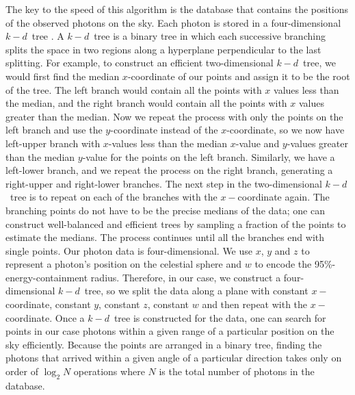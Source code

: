 \documentclass[useAMS,usenatbib]{mn2e}
\begin{document}
The key to the speed of this algorithm is the database that contains
the positions of the observed photons on the sky.  Each photon is
stored in a four-dimensional $k-d$~tree
\citep{Bentley:1975:MBS:361002.361007}.  A $k-d$~tree is a binary tree
in which each successive branching splits the space in two regions
along a hyperplane perpendicular to the last splitting.  For example,
to construct an efficient two-dimensional $k-d$~tree, we would first
find the median $x$-coordinate of our points and assign it to be the
root of the tree.  The left branch would contain all the points with
$x$ values less than the median, and the right branch would contain
all the points with $x$ values greater than the median.  Now we repeat
the process with only the points on the left branch and use the
$y$-coordinate instead of the $x$-coordinate, so we now have
left-upper branch with $x$-values less than the median $x$-value and
$y$-values greater than the median $y$-value for the points on the
left branch.  Similarly, we have a left-lower branch, and we repeat
the process on the right branch, generating a right-upper and
right-lower branches.  The next step in the two-dimensional $k-d$~tree
is to repeat on each of the branches with the $x-$coordinate again.
The branching points do not have to be the precise medians of the
data; one can construct well-balanced and efficient trees by sampling
a fraction of the points to estimate the medians.  The process
continues until all the branches end with single points.  Our photon
data is four-dimensional.  We use $x$, $y$ and $z$ to represent a
photon's position on the celestial sphere and $w$ to encode the
95\%-energy-containment radius. Therefore, in our case, we construct a
four-dimensional $k-d$~tree, so we split the data along a plane with
constant $x-$coordinate, constant $y$, constant $z$, constant $w$ and
then repeat with the $x-$coordinate.  Once a $k-d$~tree is constructed
for the data, one can search for points in our case photons within a
given range of a particular position on the sky efficiently.  Because
the points are arranged in a binary tree, finding the photons that
arrived within a given angle of a particular direction takes only on
order of $\log_2 N$ operations where $N$ is the total number of
photons in the database.
\end{document}

